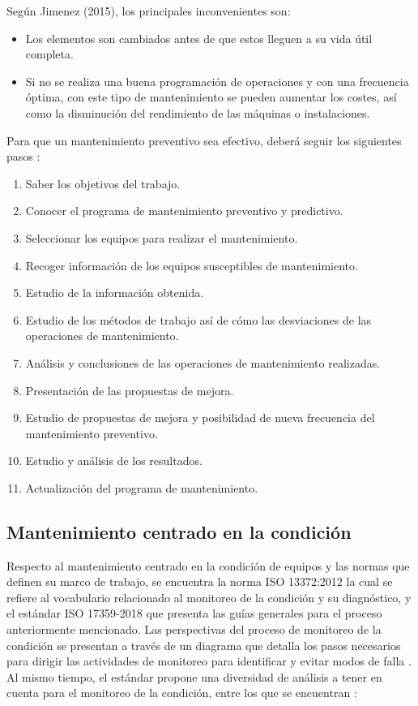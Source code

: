 Según Jimenez (2015), los principales inconvenientes son:

\begin{itemize}
\item Los elementos son cambiados antes de que estos lleguen a su vida útil completa.
\item Si no se realiza una buena programación de operaciones y con una frecuencia óptima, con este tipo de mantenimiento se pueden aumentar los costes, así como la disminución del rendimiento de las máquinas o instalaciones.
\end{itemize}

Para que un mantenimiento preventivo sea efectivo, deberá seguir los siguientes pasos \parencite{jimenez2015}:

\begin{enumerate}
\item Saber los objetivos del trabajo.
\item Conocer el programa de mantenimiento preventivo y predictivo.
\item Seleccionar los equipos para realizar el mantenimiento.
\item Recoger información de los equipos susceptibles de mantenimiento.
\item Estudio de la información obtenida.
\item Estudio de los métodos de trabajo así de cómo las desviaciones de las operaciones de mantenimiento.
\item Análisis y conclusiones de las operaciones de mantenimiento realizadas.
\item Presentación de las propuestas de mejora.
\item Estudio de propuestas de mejora y posibilidad de nueva frecuencia del mantenimiento preventivo.
\item Estudio y análisis de los resultados.
\item Actualización del programa de mantenimiento.
\end{enumerate}



\subsection{Mantenimiento centrado en la condición}


Respecto al mantenimiento centrado en la condición de equipos y las normas que definen su marco de trabajo, se encuentra la norma ISO 13372:2012 la cual se refiere al vocabulario relacionado al monitoreo de la condición y su diagnóstico, y el estándar ISO 17359-2018 que presenta las guías generales para el proceso anteriormente mencionado.
Las perspectivas del proceso de monitoreo de la condición se presentan a través de un diagrama que detalla los pasos necesarios para dirigir las actividades de monitoreo para identificar y evitar modos de falla \parencite{iso2018}. 
Al mismo tiempo, el estándar propone una diversidad de análisis a tener en cuenta para el monitoreo de la condición, entre los que se encuentran \parencite{iso2018}:

